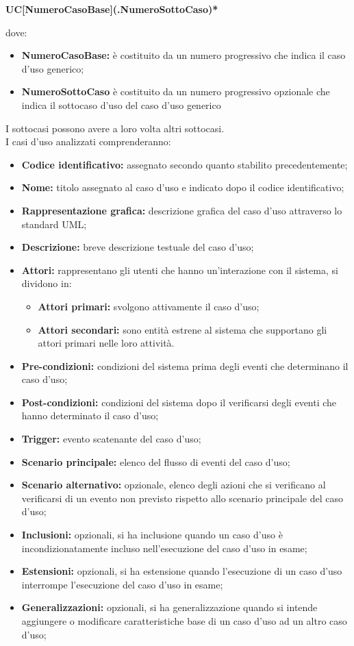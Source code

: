 \begin{center}
	\textbf{UC[NumeroCasoBase](.NumeroSottoCaso)*}
\end{center}
dove:
\begin{itemize}
	\item \textbf{NumeroCasoBase:} è costituito da un numero progressivo che indica il caso d'uso generico;
	\item \textbf{NumeroSottoCaso} è costituito da un numero progressivo opzionale che indica il sottocaso d'uso del caso d'uso generico
\end{itemize}  
I sottocasi possono avere a loro volta altri sottocasi.	\\ 
I casi d'uso analizzati comprenderanno:
\begin{itemize}
	\item \textbf{Codice identificativo: }assegnato secondo quanto stabilito precedentemente;
	\item \textbf{Nome: }titolo assegnato al caso d'uso e indicato dopo il codice identificativo; 
	\item \textbf{Rappresentazione grafica: }descrizione grafica del caso d'uso attraverso lo standard UML;
	\item \textbf{Descrizione: }breve descrizione testuale del caso d'uso;
	\item \textbf{Attori: }rappresentano gli utenti che hanno un'interazione con il sistema, si dividono in:
	\begin{itemize}
		\item \textbf{Attori primari: }svolgono attivamente il caso d'uso;
		\item \textbf{Attori secondari: }sono entità estrene al sistema che supportano gli attori primari nelle loro attività.
	\end{itemize}
	\item \textbf{Pre-condizioni: }condizioni del sistema prima degli eventi che determinano il caso d'uso;
	\item \textbf{Post-condizioni: }condizioni del sistema dopo il verificarsi degli eventi che hanno determinato il caso d'uso;
	\item \textbf{Trigger: }evento scatenante del caso d'uso;
	\item \textbf{Scenario principale: }elenco del flusso di eventi del caso d'uso;
	\item \textbf{Scenario alternativo: }opzionale, elenco degli azioni che si verificano al verificarsi di un evento non previsto rispetto allo scenario principale del caso d'uso;
	\item \textbf{Inclusioni: }opzionali, si ha inclusione quando un caso d'uso è incondizionatamente incluso nell'esecuzione del caso d'uso in esame;	
	\item \textbf{Estensioni: }opzionali, si ha estensione quando l'esecuzione di un caso d'uso interrompe l'esecuzione del caso d'uso in esame;
	\item \textbf{Generalizzazioni: }opzionali, si ha generalizzazione quando si intende aggiungere o modificare caratteristiche base di un caso d'uso ad un altro caso d'uso;
\end{itemize}

